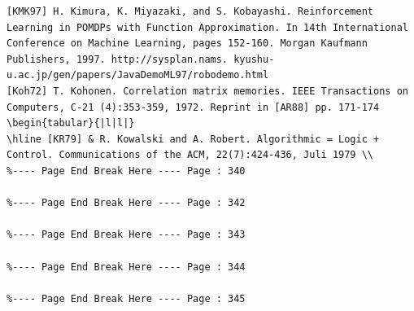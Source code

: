 \documentclass[10pt]{book}
\begin{document}
\begin{center}
\begin{enumerate}
\begin{center}
\begin{center}
\begin{center}
\begin{center}
\begin{center}
\begin{verbatim}
[KMK97] H. Kimura, K. Miyazaki, and S. Kobayashi. Reinforcement Learning in POMDPs with Function Approximation. In 14th International Conference on Machine Learning, pages 152-160. Morgan Kaufmann Publishers, 1997. http://sysplan.nams. kyushu-u.ac.jp/gen/papers/JavaDemoML97/robodemo.html
[Koh72] T. Kohonen. Correlation matrix memories. IEEE Transactions on Computers, C-21 (4):353-359, 1972. Reprint in [AR88] pp. 171-174
\begin{tabular}{|l|l|}
\hline [KR79] & R. Kowalski and A. Robert. Algorithmic = Logic + Control. Communications of the ACM, 22(7):424-436, Juli 1979 \\
%---- Page End Break Here ---- Page : 340

%---- Page End Break Here ---- Page : 342

%---- Page End Break Here ---- Page : 343

%---- Page End Break Here ---- Page : 344

%---- Page End Break Here ---- Page : 345


\end{verbatim}
\end{center}
\end{center}
\end{center}
\end{center}
\end{center}
\end{enumerate}
\end{center}
\end{document}

